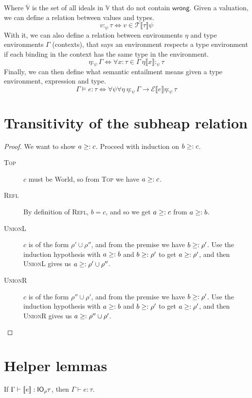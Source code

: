 Where $\overline{\mathbb{V}}$ is the set of all ideals in $\mathbb{V}$
that do not contain $\mathsf{wrong}$. 
Given a valuation, we can define a relation between values and types.
\[ v :_\psi \tau \iff v \in \mathcal{T} \llbracket \tau \rrbracket\psi \]
With it, we can also define a relation between environments $\eta$ and
type environments $\Gamma$ (contexts), that says an environment respects a
type environment if each binding
in the context has the same type in the environment.
\[ \eta :_\psi \Gamma \iff \forall x : \tau \in \Gamma \ \eta\llbracket x \rrbracket :_\psi \tau\]
Finally, we can then define what semantic entailment means
given a type environment, expression and type.
\[
  \Gamma \vDash e : \tau \iff \forall \psi \forall \eta \ \eta:_\psi \Gamma \rightarrow \mathcal{E} \llbracket e \rrbracket \eta :_\psi \tau
\]

\section{Transitivity of the subheap relation}\label{proof:subheaptransitive}
\begin{proof}
  We want to show $a \geq: c$. Proceed with induction on $b \geq: c$.
  \begin{description}
  \item[\rm\textsc{Top}]
    $c$ must be \textsf{World}, so from \textsc{Top} we have $a
    \geq: c$.
  \item[\rm\textsc{Refl}] By definition of \textsc{Refl}, $b =
    c$, and so we get $a \geq: c$ from $a \geq: b$.
  \item[\rm\textsc{UnionL}] $c$ is of the form $\rho' \cup \rho''$, and
    from the premise we have $b \geq: \rho'$. Use the induction
    hypothesis with $a \geq: b$ and $b \geq: \rho'$ to get $a \geq:
    \rho'$, and then \textsc{UnionL} gives us $a \geq: \rho' \cup \rho''$.
  \item[\rm\textsc{UnionR}]  $c$ is of the form $\rho'' \cup \rho'$, and
    from the premise we have $b \geq: \rho'$. Use the induction
    hypothesis with $a \geq: b$ and $b \geq: \rho'$ to get $a \geq:
    \rho'$, and then \textsc{UnionR} gives us $a \geq: \rho'' \cup \rho'$.
  \end{description}
\end{proof}

\section{Helper lemmas}
\begin{lemma}\label{lem:unwrapLift}
  If $\Gamma \vdash [\![ e]\!] : \mathsf{IO}_\rho \tau$, then $\Gamma \vdash e : \tau$.
\end{lemma}

